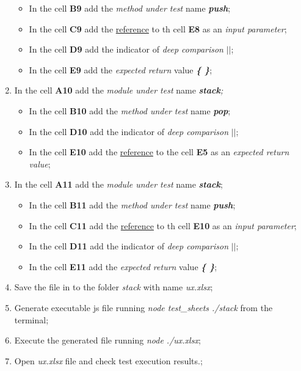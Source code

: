 \begin{enumerate}
	\begin{itemize}
		\item In the cell \textbf{B9} add the \textit{method under test} name \textit{\textbf{push}};
		\item In the cell \textbf{C9} add the \underline{reference} to th cell \textbf{E8} as an \textit{input parameter};
		\item In the cell \textbf{D9} add the indicator of\textit{ deep comparison}\textit{ \textbf{$||$}};
		\item In the cell \textbf{E9} add the \textit{expected return} value\textit{ \textbf{ \{ \}}};
	\end{itemize}
%	
	\item In the cell \textbf{A10} add the \textit{module under test} name\textit{\textbf{ stack};}
	\begin{itemize}
		\item In the cell \textbf{B10} add the \textit{method under test} name\textit{ \textbf{ pop}};
		\item In the cell \textbf{D10} add the indicator of \textit{ deep comparison}\textit{ \textbf{$||$}};
		\item In the cell \textbf{E10} add the \underline{reference} to the cell \textbf{E5} as an \textit{expected return value};
	\end{itemize}
%	
	\item In the cell \textbf{A11} add the \textit{module under test} name \textit{\textbf{stack}};
	\begin{itemize}
		\item In the cell \textbf{B11} add the \textit{method under test} name \textit{\textbf{push}};
		\item In the cell \textbf{C11} add the \underline{reference} to th cell \textbf{E10} as an\textit{ input parameter};
		\item In the cell \textbf{D11} add the indicator of \textit{deep comparison}\textit{ \textbf{$||$}};
		\item In the cell \textbf{E11} add the \textit{expected return} value \textit{\textbf{ \{ \}}};
	\end{itemize}
%	
	\item Save the file in to the folder \textit{stack} with name \textit{ux.xlsx};
%	
	\item Generate executable js file running \textit{node test\_sheets ./stack} from the terminal;
%	
	\item Execute the generated file running \textit{node ./ux.xlsx};
	
	\item Open \textit{ux.xlsx} file and check test execution results.;
\end{enumerate}

